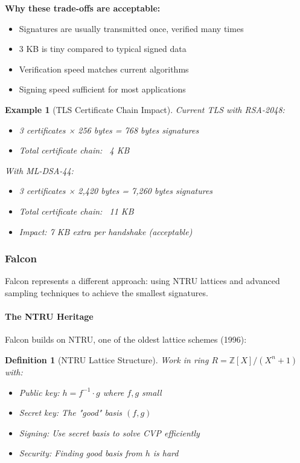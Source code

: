 \documentclass[11pt,a4paper]{article}
\newtheorem{definition}{Definition}
\newtheorem{example}{Example}
\begin{document}
\textbf{Why these trade-offs are acceptable:}
\begin{itemize}
    \item Signatures are usually transmitted once, verified many times
    \item 3 KB is tiny compared to typical signed data
    \item Verification speed matches current algorithms
    \item Signing speed sufficient for most applications
\end{itemize}

\begin{example}[TLS Certificate Chain Impact]
Current TLS with RSA-2048:
\begin{itemize}
    \item 3 certificates × 256 bytes = 768 bytes signatures
    \item Total certificate chain: ~4 KB
\end{itemize}

With ML-DSA-44:
\begin{itemize}
    \item 3 certificates × 2,420 bytes = 7,260 bytes signatures
    \item Total certificate chain: ~11 KB
    \item Impact: 7 KB extra per handshake (acceptable)
\end{itemize}
\end{example}

\subsubsection{Falcon}

Falcon represents a different approach: using NTRU lattices and advanced sampling techniques to achieve the smallest signatures.

\paragraph{The NTRU Heritage}

Falcon builds on NTRU, one of the oldest lattice schemes (1996):

\begin{definition}[NTRU Lattice Structure]
Work in ring $R = \mathbb{Z}[X]/(X^n + 1)$ with:
\begin{itemize}
    \item Public key: $h = f^{-1} \cdot g$ where $f, g$ small
    \item Secret key: The "good" basis $(f, g)$
    \item Signing: Use secret basis to solve CVP efficiently
    \item Security: Finding good basis from $h$ is hard
\end{itemize}
\end{definition}
\end{document}
